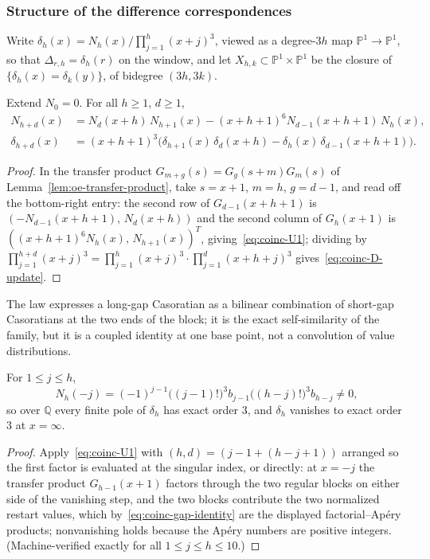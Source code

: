 \subsubsection*{Structure of the difference correspondences}

Write $\delta_h(x)=N_h(x)/\prod_{j=1}^h(x+j)^3$, viewed as a degree-$3h$
map $\mathbb P^1\to\mathbb P^1$, so that $\Delta_{r,h}=\delta_h(r)$ on the
window, and let
$X_{h,k}\subset\mathbb P^1\times\mathbb P^1$ be the closure of
$\{\delta_h(x)=\delta_k(y)\}$, of bidegree $(3h,3k)$.

\begin{lemma}\label{lem:coinc-addition}
Extend $N_0=0$.  For all $h\ge1$, $d\ge1$,
\begin{align}
 N_{h+d}(x)&=N_d(x+h)\,N_{h+1}(x)-(x+h+1)^6N_{d-1}(x+h+1)\,N_h(x),
 \label{eq:coinc-U1}\\
 \delta_{h+d}(x)&=(x+h+1)^3\bigl(\delta_{h+1}(x)\,\delta_d(x+h)
 -\delta_h(x)\,\delta_{d-1}(x+h+1)\bigr).\label{eq:coinc-D-update}
\end{align}
\end{lemma}

\begin{proof}
In the transfer product $G_{m+g}(s)=G_g(s+m)G_m(s)$ of
Lemma~\ref{lem:oe-transfer-product}, take $s=x+1$, $m=h$, $g=d-1$, and
read off the bottom-right entry: the second row of $G_{d-1}(x+h+1)$ is
$(-N_{d-1}(x+h+1),\,N_d(x+h))$ and the second column of $G_h(x+1)$ is
$((x+h+1)^6N_h(x),\,N_{h+1}(x))^{T}$, giving~\eqref{eq:coinc-U1};
dividing by $\prod_{j=1}^{h+d}(x+j)^3=\prod_{j=1}^{h}(x+j)^3\cdot
\prod_{j=1}^{d}(x+h+j)^3$ gives~\eqref{eq:coinc-D-update}.
\end{proof}

The law expresses a long-gap Casoratian as a bilinear combination of
short-gap Casoratians at the two ends of the block; it is the exact
self-similarity of the family, but it is a coupled identity at one base
point, not a convolution of value distributions.

\begin{lemma}\label{lem:coinc-poles}
For $1\le j\le h$,
\[
 N_h(-j)=(-1)^{j-1}\bigl((j-1)!\bigr)^3b_{j-1}\bigl((h-j)!\bigr)^3b_{h-j}
 \ne0 ,
\]
so over $\mathbb Q$ every finite pole of $\delta_h$ has exact order $3$,
and $\delta_h$ vanishes to exact order $3$ at $x=\infty$.
\end{lemma}

\begin{proof}
Apply~\eqref{eq:coinc-U1} with $(h,d)=(j-1+(h-j+1))$ arranged so the
first factor is evaluated at the singular index, or directly: at
$x=-j$ the transfer product $G_{h-1}(x+1)$ factors through the two
regular blocks on either side of the vanishing step, and the two blocks
contribute the two normalized restart values, which
by~\eqref{eq:coinc-gap-identity} are the displayed factorial--Ap\'ery
products; nonvanishing holds because the Ap\'ery numbers are positive
integers.  (Machine-verified exactly for all $1\le j\le h\le10$.)
\end{proof}

